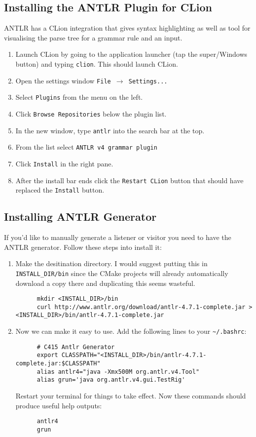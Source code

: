 \documentclass[../setup.tex]{subfiles}
\begin{document}
\subsection{Installing the ANTLR Plugin for CLion}
ANTLR has a CLion integration that gives syntax highlighting as well as tool for visualising the
parse tree for a grammar rule and an input.
\begin{enumerate}
	\item
    Launch CLion by going to the application launcher (tap the super/Windows button) and typing
    \lstinline{clion}. This should launch CLion.
	\item
    Open the settings window \texttt{File $\rightarrow$ Settings...}
  \item
    Select \texttt{Plugins} from the menu on the left.
	\item
    Click \texttt{Browse Repositories} below the plugin list.
  \item
    In the new window, type \texttt{antlr} into the search bar at the top.
	\item
    From the list select \lstinline{ANTLR v4 grammar plugin}
  \item
    Click \texttt{Install} in the right pane.
	\item
    After the install bar ends click the \texttt{Restart CLion} button that should have replaced
    the \texttt{Install} button.
\end{enumerate}

\subsection{Installing ANTLR Generator}
If you'd like to manually generate a listener or visitor you need to have the ANTLR generator.
Follow these steps into install it:
\begin{enumerate}
  \item
    Make the desitination directory. I would suggest putting this in \lstinline{INSTALL_DIR/bin}
    since the CMake projects will already automatically download a copy there and duplicating
    this seems wasteful.
    \begin{lstlisting}
      mkdir <INSTALL_DIR>/bin
      curl http://www.antlr.org/download/antlr-4.7.1-complete.jar > <INSTALL_DIR>/bin/antlr-4.7.1-complete.jar
    \end{lstlisting}
  \item
    Now we can make it easy to use. Add the following lines to your \lstinline{~/.bashrc}:
    \begin{lstlisting}
      # C415 Antlr Generator
      export CLASSPATH="<INSTALL_DIR>/bin/antlr-4.7.1-complete.jar:$CLASSPATH"
      alias antlr4="java -Xmx500M org.antlr.v4.Tool"
      alias grun='java org.antlr.v4.gui.TestRig'
    \end{lstlisting}
    Restart your terminal for things to take effect. Now these commands should produce useful help
    outputs:
    \begin{lstlisting}
      antlr4
      grun
    \end{lstlisting}
\end{enumerate}
\end{document}
